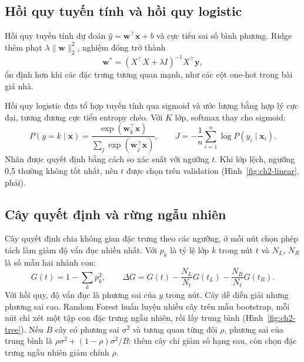 \subsection{Hồi quy tuyến tính và hồi quy logistic}
Hồi quy tuyến tính dự đoán $\hat y=\mathbf{w}^\top\mathbf{x}+b$ và cực tiểu sai số bình phương. Ridge \cite{ch2:hoerl1970} thêm phạt $\lambda\|\mathbf{w}\|_2^2$, nghiệm đóng trở thành
\begin{equation}
  \mathbf{w}^*=(X^\top X+\lambda I)^{-1}X^\top\mathbf{y},
\end{equation}
ổn định hơn khi các đặc trưng tương quan mạnh, như các cột one-hot trong bài giá nhà.

Hồi quy logistic \cite{ch2:cox1958} đưa tổ hợp tuyến tính qua sigmoid và ước lượng bằng hợp lý cực đại, tương đương cực tiểu entropy chéo. Với $K$ lớp, softmax thay cho sigmoid:
\begin{equation}
  P(y=k\mid\mathbf{x})=\frac{\exp(\mathbf{w}_k^\top\mathbf{x})}{\sum_{j}\exp(\mathbf{w}_j^\top\mathbf{x})},\qquad
  J=-\frac1n\sum_{i=1}^n\log P(y_i\mid\mathbf{x}_i).
\end{equation}
Nhãn được quyết định bằng cách so xác suất với ngưỡng $t$. Khi lớp lệch, ngưỡng 0,5 thường không tốt nhất, nên $t$ được chọn trên validation (Hình~\ref{fig:ch2-linear}, phải).


\subsection{Cây quyết định và rừng ngẫu nhiên}
Cây quyết định \cite{ch2:breiman1984,ch2:quinlan1986} chia không gian đặc trưng theo các ngưỡng, ở mỗi nút chọn phép tách làm giảm độ vẩn đục nhiều nhất. Với $p_k$ là tỷ lệ lớp $k$ trong nút $t$ và $N_L$, $N_R$ là số mẫu hai nhánh con:
\begin{equation}
  G(t)=1-\sum_{k}p_k^2,\qquad \Delta G=G(t)-\frac{N_L}{N_t}G(t_L)-\frac{N_R}{N_t}G(t_R).
\end{equation}
Với hồi quy, độ vẩn đục là phương sai của $y$ trong nút. Cây dễ diễn giải nhưng phương sai cao. Random Forest \cite{ch2:breiman2001} huấn luyện nhiều cây trên mẫu bootstrap, mỗi nút chỉ xét một tập con đặc trưng ngẫu nhiên, rồi lấy trung bình (Hình~\ref{fig:ch2-tree}). Nếu $B$ cây có phương sai $\sigma^2$ và tương quan từng đôi $\rho$, phương sai của trung bình là $\rho\sigma^2+(1-\rho)\sigma^2/B$: thêm cây chỉ giảm số hạng sau, còn chọn đặc trưng ngẫu nhiên giảm chính $\rho$.

